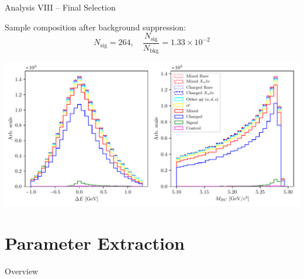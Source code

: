 \documentclass[serif]{beamer}
\newcommand {\E}[1]{\times 10^{#1}}
\begin{document}

\begin{frame}[t]{Analysis VIII -- Final Selection}
\vspace{-3mm}
\small

Sample composition after background suppression:
$$N_{\mathrm{sig}} = 264,\quad \frac{N_{\mathrm{sig}}}{N_{\mathrm{bkg}}} = 1.33\E{-2}$$

\begin{center}
	\includegraphics[width=\textwidth]{fig/opt_uBB_si}
\end{center}



\end{frame}




\section{Parameter Extraction} 

\begin{frame}[t]{Overview}
\end{frame}


\end{document}

